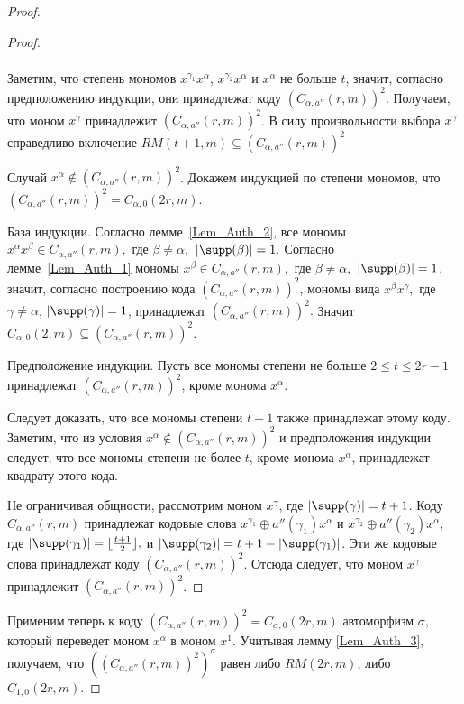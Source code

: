 \begin{proof}
\begin{proof}
\begin{equation*}
\begin{split}
			\end{split}
		\end{equation*}

		Заметим, что степень мономов $x^{\gamma_1}x^{\alpha}$, $x^{\gamma_2}x^{\alpha}$ и $x^{\alpha}$ не больше $t$, значит, согласно предположению индукции, они принадлежат коду $(C_{\alpha,a''}(r,m))^2$.
		Получаем, что моном $x^\gamma$ принадлежит $(C_{\alpha,a''}(r,m))^2$.
		В силу произвольности выбора $x^\gamma$ справедливо включение $RM(t+1,m) \subseteq (C_{\alpha,a''}(r,m))^2$

		Случай $x^{\alpha} \not\in (C_{\alpha,a''}(r,m))^2$.
		Докажем индукцией по степени мономов, что $(C_{\alpha,a''}(r,m))^2=C_{\alpha,0}(2r,m)$.

		База индукции.
		Согласно лемме~\ref{Lem_Auth_2}, все мономы $x^{\alpha}x^{\beta} \in C_{\alpha,a''}(r,m),$ где $\beta \not= \alpha,$ $|\supp(\beta)|=1.$
		Согласно лемме~\ref{Lem_Auth_1} мономы $x^{\beta} \in C_{\alpha,a''}(r,m),$ где $\beta \not= \alpha,$ $ |\supp(\beta)|=1$, значит, согласно построению кода $(C_{\alpha,a''}(r,m))^2$, мономы вида $x^{\beta}x^{\gamma},$ где $\gamma \not= \alpha$, $|\supp(\gamma)|=1$,  принадлежат $(C_{\alpha,a''}(r,m))^2.$ Значит $C_{\alpha,0}(2,m)\subseteq (C_{\alpha,a''}(r,m))^2$.

		Предположение индукции.
		Пусть все мономы степени не больше $2\leqslant t\leqslant 2r-1$ принадлежат $(C_{\alpha,a''}(r,m))^2$, кроме монома $x^{\alpha}$.

		Следует доказать, что все мономы степени $t+1$ также принадлежат этому коду.
		Заметим, что из условия $x^{\alpha} \not\in (C_{\alpha,a''}(r,m))^2$ и предположения индукции следует, что все мономы степени не более $t$, кроме монома $x^{\alpha}$, принадлежат квадрату этого кода.

		Не ограничивая общности, рассмотрим моном $x^{\gamma}$, где $|\supp(\gamma)| = t+1$.
		Коду $C_{\alpha,a''}(r,m)$ принадлежат кодовые слова $x^{\gamma_1} \oplus a''(\gamma_1)x^{\alpha}$ и $x^{\gamma_2} \oplus a''(\gamma_2)x^{\alpha}$, где $|\supp(\gamma_1)| = \lfloor\frac{t+1}{2}\rfloor,$ и $|\supp(\gamma_2)| = t+1 - |\supp(\gamma_1)|$.
		Эти же кодовые слова принадлежат коду $(C_{\alpha,a''}(r,m))^2$.
		Отсюда следует, что моном $x^{\gamma}$ принадлежит $(C_{\alpha,a''}(r,m))^2$.
	\end{proof}

	Применим теперь к коду $(C_{\alpha,a''}(r,m))^2=C_{\alpha,0}(2r,m)$ автоморфизм $\sigma$, который переведет моном $x^{\alpha}$ в моном $x^1$.
	Учитывая лемму \ref{Lem_Auth_3}, получаем, что $((C_{\alpha,a''}(r,m))^2)^{\sigma}$ равен либо $RM(2r,m)$, либо $C_{1,0}(2r,m).$
\end{proof}

